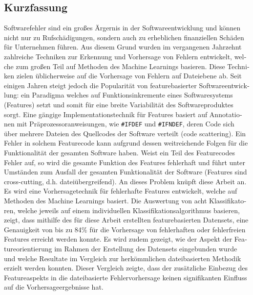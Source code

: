 
\begin{otherlanguage}{ngerman}
    \section*{Kurzfassung}

Softwarefehler sind ein großes Ärgernis in der Softwareentwicklung und können nicht nur zu Rufschädigungen, sondern auch zu erheblichen finanziellen Schäden für Unternehmen führen. Aus diesem Grund wurden im vergangenen Jahrzehnt zahlreiche Techniken zur Erkennung und Vorhersage von Fehlern entwickelt, welche zum großen Teil auf Methoden des Machine Learnings basieren. Diese Techniken zielen üblicherweise auf die Vorhersage von Fehlern auf Dateiebene ab. Seit einigen Jahren steigt jedoch die Popularität von featurebasierter Softwareentwicklung: ein Paradigma welches auf Funktionsinkremente eines Softwaresystems (Features) setzt und somit für eine breite Variabilität des Softwareproduktes sorgt. Eine gängige Implementationstechnik für Features basiert auf Annotationen mit Präprozessoranweisungen, wie \texttt{\#IFDEF} und \texttt{\#IFNDEF}, deren Code sich über mehrere Dateien des Quellcodes der Software verteilt (\glqq code scattering\grqq). Ein Fehler in solchem Featurecode kann aufgrund dessen weitreichende Folgen für die Funktionalität der gesamten Software haben. Weist ein Teil des Featurecodes Fehler auf, so wird die gesamte Funktion des Features fehlerhaft und führt unter Umständen zum Ausfall der gesamten Funktionalität der Software (Features sind \glqq cross-cutting\grqq, d.h. dateiübergreifend). An dieses Problem knüpft diese Arbeit an. Es wird eine Vorhersagetechnik für fehlerhafte Features entwickelt, welche auf Methoden des Machine Learnings basiert. Die Auswertung von acht Klassifikatoren, welche jeweils auf einem individuellen Klassifikationsalgorithmus basieren, zeigt, dass mithilfe des für diese Arbeit erstellten featurebasierten Datensets, eine Genauigkeit von bis zu 84\% für die Vorhersage von fehlerhaften oder fehlerfreien Features erreicht werden konnte. Es wird zudem gezeigt, wie der Aspekt der Featureorientierung im Rahmen der Erstellung des Datensets eingebunden wurde und welche Resultate im Vergleich zur herkömmlichen dateibasierten Methodik erzielt werden konnten. Dieser Vergleich zeigte, dass der zusätzliche Einbezug des Featureaspekts in die dateibasierte Fehlervorhersage keinen signifikanten Einfluss auf die Vorhersageergebnisse hat.

\end{otherlanguage}

